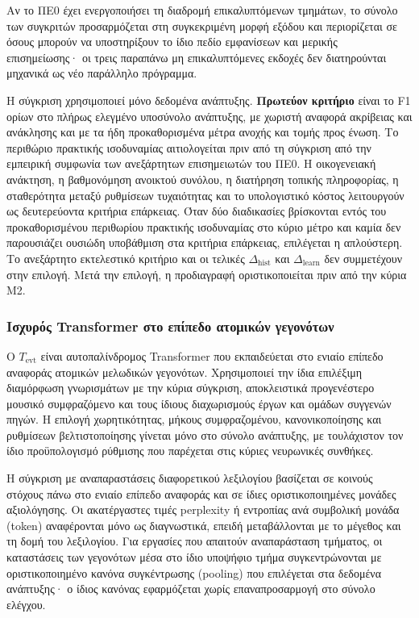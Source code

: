 \documentclass[11pt,a4paper]{article}
\begin{document}
Αν το ΠΕ0 έχει ενεργοποιήσει τη διαδρομή επικαλυπτόμενων τμημάτων, το σύνολο των συγκριτών προσαρμόζεται στη συγκεκριμένη μορφή εξόδου και περιορίζεται σε όσους μπορούν να υποστηρίξουν το ίδιο πεδίο εμφανίσεων και μερικής επισημείωσης· οι τρεις παραπάνω μη επικαλυπτόμενες εκδοχές δεν διατηρούνται μηχανικά ως νέο παράλληλο πρόγραμμα.

Η σύγκριση χρησιμοποιεί μόνο δεδομένα ανάπτυξης. \textbf{Πρωτεύον κριτήριο} είναι το F1 ορίων στο πλήρως ελεγμένο υποσύνολο ανάπτυξης, με χωριστή αναφορά ακρίβειας και ανάκλησης και με τα ήδη προκαθορισμένα μέτρα ανοχής και τομής προς ένωση. Το περιθώριο πρακτικής ισοδυναμίας αιτιολογείται πριν από τη σύγκριση από την εμπειρική συμφωνία των ανεξάρτητων επισημειωτών του ΠΕ0. Η οικογενειακή ανάκτηση, η βαθμονόμηση ανοικτού συνόλου, η διατήρηση τοπικής πληροφορίας, η σταθερότητα μεταξύ ρυθμίσεων τυχαιότητας και το υπολογιστικό κόστος λειτουργούν ως δευτερεύοντα κριτήρια επάρκειας. Όταν δύο διαδικασίες βρίσκονται εντός του προκαθορισμένου περιθωρίου πρακτικής ισοδυναμίας στο κύριο μέτρο και καμία δεν παρουσιάζει ουσιώδη υποβάθμιση στα κριτήρια επάρκειας, επιλέγεται η απλούστερη. Το ανεξάρτητο εκτελεστικό κριτήριο και οι τελικές $\Delta_{\mathrm{hist}}$ και $\Delta_{\mathrm{learn}}$ δεν συμμετέχουν στην επιλογή. Μετά την επιλογή, η προδιαγραφή οριστικοποιείται πριν από την κύρια M2.

\subsubsection{Ισχυρός Transformer στο επίπεδο ατομικών γεγονότων}\label{app:event-transformer}

Ο $T_{\mathrm{evt}}$ είναι αυτοπαλίνδρομος Transformer που εκπαιδεύεται στο ενιαίο επίπεδο αναφοράς ατομικών μελωδικών γεγονότων. Χρησιμοποιεί την ίδια επιλέξιμη διαμόρφωση γνωρισμάτων με την κύρια σύγκριση, αποκλειστικά προγενέστερο μουσικό συμφραζόμενο και τους ίδιους διαχωρισμούς έργων και ομάδων συγγενών πηγών. Η επιλογή χωρητικότητας, μήκους συμφραζομένου, κανονικοποίησης και ρυθμίσεων βελτιστοποίησης γίνεται μόνο στο σύνολο ανάπτυξης, με τουλάχιστον τον ίδιο προϋπολογισμό ρύθμισης που παρέχεται στις κύριες νευρωνικές συνθήκες.

Η σύγκριση με αναπαραστάσεις διαφορετικού λεξιλογίου βασίζεται σε κοινούς στόχους πάνω στο ενιαίο επίπεδο αναφοράς και σε ίδιες οριστικοποιημένες μονάδες αξιολόγησης. Οι ακατέργαστες τιμές perplexity ή εντροπίας ανά συμβολική μονάδα (token) αναφέρονται μόνο ως διαγνωστικά, επειδή μεταβάλλονται με το μέγεθος και τη δομή του λεξιλογίου. Για εργασίες που απαιτούν αναπαράσταση τμήματος, οι καταστάσεις των γεγονότων μέσα στο ίδιο υποψήφιο τμήμα συγκεντρώνονται με οριστικοποιημένο κανόνα συγκέντρωσης (pooling) που επιλέγεται στα δεδομένα ανάπτυξης· ο ίδιος κανόνας εφαρμόζεται χωρίς επαναπροσαρμογή στο σύνολο ελέγχου.
\end{document}
